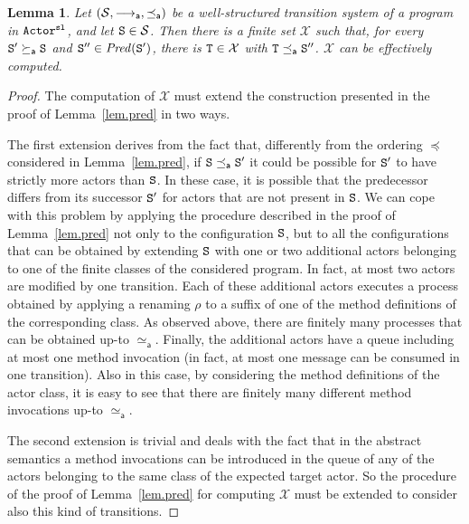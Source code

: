 \documentclass{LMCS}
\newcommand{\cal}{\mathcal}
\theoremstyle{plain}\newtheorem{proposition}[thm]{Proposition}
\theoremstyle{plain}\newtheorem{lemma}[thm]{Lemma}
\theoremstyle{plain}\newtheorem{theorem}[thm]{Theorem}
\theoremstyle{plain}\newtheorem{corollary}[thm]{Corollary}
\newif\ifconf \conffalse
\newcommand{\State}{{\tt S}}
\newcommand{\StateT}{{\tt T}}
\newcommand{\pred}[1]{{\it Pred}(#1)}
\newcommand{\actsl}{${\tt Actor^{\tt sl}}$}
\begin{document}
\begin{lemma}
\label{lem.predunbounded}
Let $({\cal S}, \absred{}, \preceq_{\mathsf a})$ be a 
well-structured transition system 
of a program in {\actsl}, and let $\State \in
{\cal S}$. Then there is a finite set ${\cal X}$
such that, for every $\State' \succeq_{\mathsf a} \State$ and 
$\State'' \in \pred{\State'}$, there is $\StateT \in {\cal X}$
with $\StateT \preceq_{\mathsf a} \State''$. ${\cal X}$ can be effectively computed.
\end{lemma}

\ifconf
\else

\begin{proof}
The computation of ${\cal X}$ must extend the 
construction presented in the proof of Lemma~\ref{lem.pred}
in two ways.

The first extension derives from the fact that, 
differently from the ordering $\preceq$ considered 
in Lemma~\ref{lem.pred}, if $\State \preceq_{\mathsf a}  \State'$ 
it could be possible for $\State'$ to have strictly
more actors than $\State$.
In these case, it is possible that the predecessor
differs from its successor $\State'$ for actors
that are not present in $\State$.
We can cope with this problem
by applying the procedure described in the proof
of Lemma~\ref{lem.pred} not only to the configuration
$\State$, but to all the configurations that can be obtained
by extending $\State$ with
one or two additional actors belonging to one of the
finite classes of the considered program. 
In fact, at most two actors are modified by one transition.
Each of these additional actors executes a process obtained
by applying a renaming $\rho$ to a suffix of 
one of the method definitions
of the corresponding class. As observed
above, there are finitely many processes that can 
be obtained up-to $\simeq_{\mathsf a}$.
Finally, the additional actors
have a queue including at most one
method invocation (in fact, at most one message
can be consumed in one transition). Also in this
case, by considering the 
method definitions of the actor class,
it is easy to see that there are finitely
many different method invocations up-to $\simeq_{\mathsf a}$.

The second extension is trivial and deals with the fact
that in the abstract semantics a method invocations can 
be introduced in the queue of any of the actors
belonging to the same class of the expected target actor.
So the procedure of the proof of Lemma~\ref{lem.pred} for computing
${\cal X}$ must be extended to consider also this kind
of transitions.
\end{proof}
\fi
\end{document}
